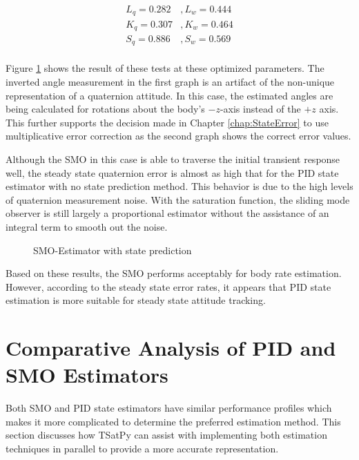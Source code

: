 \begin{equation}
  \begin{aligned}
    L_q = 0.282 &, L_w = 0.444 \\
    K_q = 0.307 &, K_w = 0.464 \\
    S_q = 0.886 &, S_w = 0.569 \\
  \end{aligned}
\end{equation}

Figure \ref{fig:SMOEstimatorwithstateprediction} shows the result of these tests at these optimized parameters.  The inverted angle measurement in the first graph is an artifact of the non-unique representation of a quaternion attitude.  In this case, the estimated angles are being calculated for rotations about the body's $-z$-axis instead of the $+z$ axis.  This further supports the decision made in Chapter \ref{chap:StateError} to use multiplicative error correction as the second graph shows the correct error values.

Although the SMO in this case is able to traverse the initial transient response well, the steady state quaternion error is almost as high that for the PID state estimator with no state prediction method.  This behavior is due to the high levels of quaternion measurement noise.  With the saturation function, the sliding mode observer is still largely a proportional estimator without the assistance of an integral term to smooth out the noise.

\begin{figure}[H]
  \centerline{}
  \caption{SMO-Estimator with state prediction}
  \label{fig:SMOEstimatorwithstateprediction}
\end{figure}

Based on these results, the SMO performs acceptably for body rate estimation.  However, according to the steady state error rates, it appears that PID state estimation is more suitable for steady state attitude tracking.

\section{Comparative Analysis of PID and SMO Estimators}
\label{sec:ComparativeAnalysysofPIDandSMOEstimators}

Both SMO and PID state estimators have similar performance profiles which makes it more complicated to determine the preferred estimation method.  This section discusses how TSatPy can assist with implementing both estimation techniques in parallel to provide a more accurate representation.

